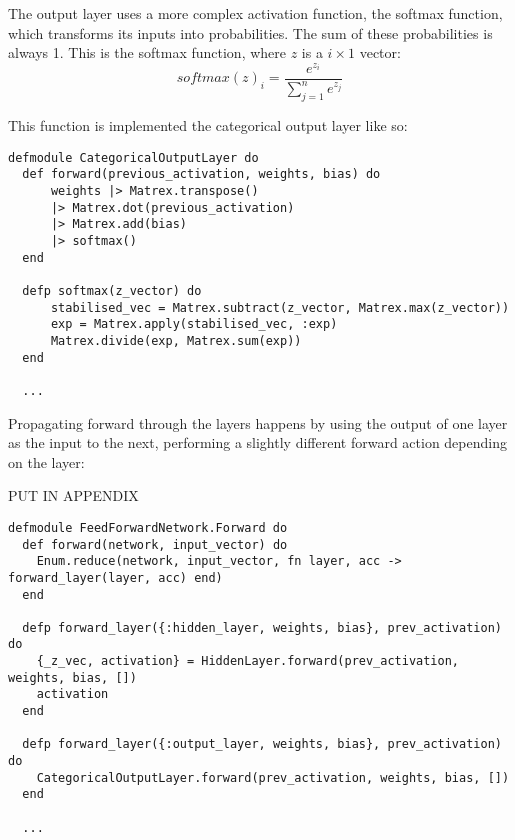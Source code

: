 The output layer uses a more complex activation function, the softmax function,
which transforms its inputs into probabilities. The sum of these probabilities
is always 1. This is the softmax function, where \(z\) is a \(i \times 1\)
vector:
\begin{equation}
    softmax(z)_{i} = \frac{e^{z_{i}}}{\sum_{j=1}^{n} e^{z_{j}}}
\end{equation}

This function is implemented the categorical output layer like so:
\begin{lstlisting}
defmodule CategoricalOutputLayer do
  def forward(previous_activation, weights, bias) do
      weights |> Matrex.transpose()
      |> Matrex.dot(previous_activation)
      |> Matrex.add(bias)
      |> softmax()
  end

  defp softmax(z_vector) do
      stabilised_vec = Matrex.subtract(z_vector, Matrex.max(z_vector))
      exp = Matrex.apply(stabilised_vec, :exp)
      Matrex.divide(exp, Matrex.sum(exp))
  end

  ...
\end{lstlisting}

Propagating forward through the layers happens by using the output of one
layer as the input to the next, performing a slightly different forward action
depending on the layer:

PUT IN APPENDIX
\begin{lstlisting}
defmodule FeedForwardNetwork.Forward do
  def forward(network, input_vector) do
    Enum.reduce(network, input_vector, fn layer, acc -> forward_layer(layer, acc) end)
  end

  defp forward_layer({:hidden_layer, weights, bias}, prev_activation) do
    {_z_vec, activation} = HiddenLayer.forward(prev_activation, weights, bias, [])
    activation
  end

  defp forward_layer({:output_layer, weights, bias}, prev_activation) do
    CategoricalOutputLayer.forward(prev_activation, weights, bias, [])
  end

  ...
\end{lstlisting}

